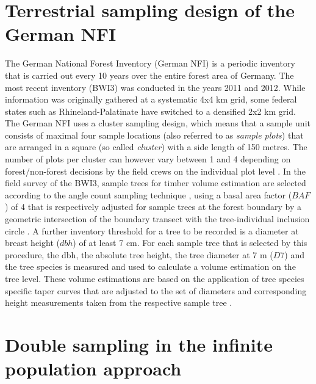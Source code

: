 

\section{Terrestrial sampling design of the German NFI}
\label{sec:germanNFI}

The German National Forest Inventory (German NFI) is a periodic inventory that is carried out every 10 years over the entire forest area of Germany. The most recent inventory (BWI3) was conducted in the years 2011 and 2012. While information was originally gathered at a systematic 4x4 km grid, some federal states such as Rhineland-Palatinate have switched to a densified 2x2 km grid. The German NFI uses a cluster sampling design, which means that a sample unit consists of maximal four sample locations (also referred to as \textit{sample plots}) that are arranged in a square (so called \textit{cluster}) with a side length of 150 metres. The number of plots per cluster can however vary between 1 and 4 depending on forest/non-forest decisions by the field crews on the individual plot level \citep{bwi3_aufn}. In the field survey of the BWI3, sample trees for timber volume estimation are selected according to the angle count sampling technique \citep{bitterlich1984}, using a basal area factor ($BAF$) of 4 that is respectively adjusted for sample trees at the forest boundary by a geometric intersection of the boundary transect with the tree-individual inclusion circle \citep{bwi3_aufn}. A further inventory threshold for a tree to be recorded is a diameter at breast height ($dbh$) of at least 7 cm. For each sample tree that is selected by this procedure, the dbh, the absolute tree height, the tree diameter at 7 m ($D7$) and the tree species is measured and used to calculate a volume estimation on the tree level. These volume estimations are based on the application of tree species specific taper curves that are adjusted to the set of diameters and corresponding height measurements taken from the respective sample tree \citep{kublin2013}.

\section{Double sampling in the infinite population approach}
\label{sec:inf_pop}


